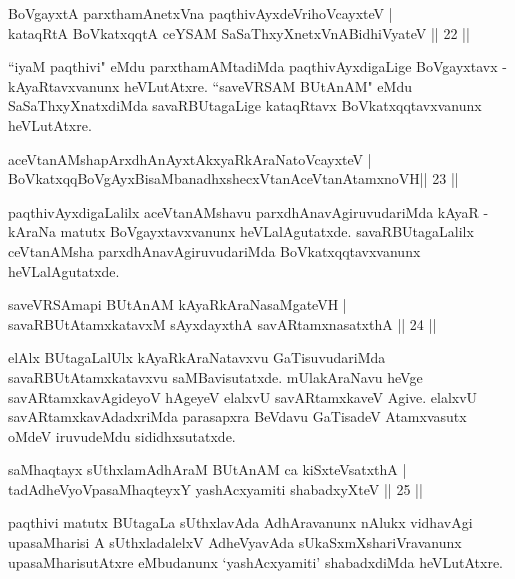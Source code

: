 \begin{shl}
BoVgayxtA parxthamAnetxVna paqthivAyxdeVrihoVcayxteV |\\
kataqRtA BoVkatxqqtA ceYSAM SaSaThxyXnetxVnABidhiVyateV \hfill || 22 || 
\end{shl}
\begin{artha}
``iyaM paqthivi" eMdu parxthamAMtadiMda paqthivAyxdigaLige BoVgayxtavx - kAyaRtavxvanunx heVLutAtxre. ``saveVRSAM BUtAnAM" eMdu SaSaThxyXnatxdiMda savaRBUtagaLige kataqRtavx BoVkatxqqtavxvanunx heVLutAtxre.
\end{artha}
\begin{shl}
aceVtanAMshapArxdhAnAyxtAkxyaRkAraNatoVcayxteV |\\
BoVkatxqqBoVgAyxBisaMbanadhxshecxVtanAceVtanAtamxnoVH\hfill  || 23 || 
\end{shl}
\begin{artha}
paqthivAyxdigaLalilx aceVtanAMshavu parxdhAnavAgiruvudariMda kAyaR - kAraNa matutx BoVgayxtavxvanunx heVLalAgutatxde. savaRBUtagaLalilx ceVtanAMsha parxdhAnavAgiruvudariMda BoVkatxqqtavxvanunx heVLalAgutatxde.
\end{artha}
\begin{shl}
saveVRSAmapi BUtAnAM kAyaRkAraNasaMgateVH |\\
savaRBUtAtamxkatavxM sAyxdayxthA savARtamxnasatxthA \hfill || 24 ||
\end{shl}
\begin{artha}
elAlx BUtagaLalUlx kAyaRkAraNatavxvu GaTisuvudariMda savaRBUtAtamxkatavxvu saMBavisutatxde. mUlakAraNavu heVge savARtamxkavAgideyoV hAgeyeV elalxvU savARtamxkaveV Agive. elalxvU savARtamxkavAdadxriMda parasapxra BeVdavu GaTisadeV Atamxvasutx oMdeV iruvudeMdu sididhxsutatxde.  
\end{artha}
\begin{shl}
saMhaqtayx sUthxlamAdhAraM BUtAnAM ca kiSxteVsatxthA |\\
tadAdheVyoVpasaMhaqteyxY yashAcxyamiti shabadxyXteV \hfill || 25 || 
\end{shl}
\begin{artha}
paqthivi matutx BUtagaLa sUthxlavAda AdhAravanunx nAlukx vidhavAgi upasaMharisi A sUthxladalelxV AdheVyavAda sUkaSxmXshariVravanunx upasaMharisutAtxre eMbudanunx `yashAcxyamiti' shabadxdiMda heVLutAtxre.
\end{artha}
